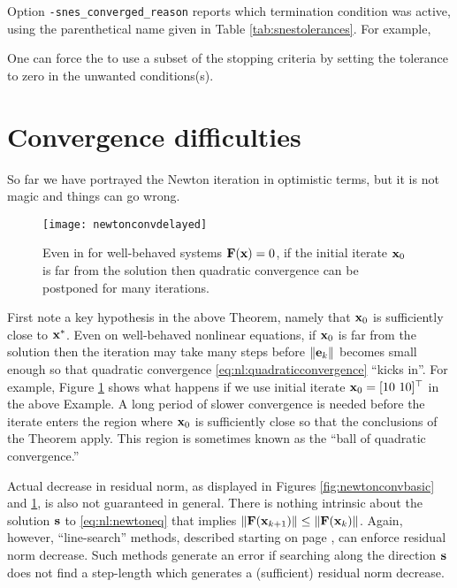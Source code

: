 \medskip
Option \texttt{-snes\_converged\_reason} reports which termination condition was active, using the parenthetical name given in Table \ref{tab:snestolerances}.  For example,
\vspace{-4mm}
One can force the \pSNES to use a subset of the stopping criteria by setting the tolerance to zero in the unwanted conditions(s).


\section{Convergence difficulties} \label{sec:divergence}

So far we have portrayed the Newton iteration in optimistic terms, but it is not magic and things can go wrong.

\begin{figure}
\texttt{[image: newtonconvdelayed]}
\caption{Even in for well-behaved systems $\mathbf{F}(\mathbf{x})=0$, if the initial iterate $\mathbf{x}_0$ is far from the solution then quadratic convergence can be postponed for many iterations.}
\label{fig:newtonconvdelayed}
\end{figure}

First note a key hypothesis in the above Theorem, namely that $\mathbf{x}_0$ is sufficiently close to $\mathbf{x}^*$.  Even on well-behaved nonlinear equations, if $\mathbf{x}_0$ is far from the solution then the iteration may take many steps before $\|\mathbf{e}_k\|$ becomes small enough so that quadratic convergence \eqref{eq:nl:quadraticconvergence} ``kicks in''.  For example, Figure \ref{fig:newtonconvdelayed} shows what happens if we use initial iterate $\mathbf{x}_0=[10\,\, 10]^\top$ in the above Example.  A long period of slower convergence is needed before the iterate enters the region where $\mathbf{x}_0$ is sufficiently close so that the conclusions of the Theorem apply.  This region is sometimes known as the ``ball of quadratic convergence.''

Actual decrease in residual norm, as displayed in Figures \ref{fig:newtonconvbasic} and \ref{fig:newtonconvdelayed}, is also not guaranteed in general.  There is nothing intrinsic about the solution $\mathbf{s}$ to \eqref{eq:nl:newtoneq} that implies $\|\mathbf{F}(\mathbf{x}_{k+1})\| \le \|\mathbf{F}(\mathbf{x}_k)\|$.  Again, however, ``line-search'' methods, described starting on page \pageref{sec:linesearch}, can enforce residual norm decrease.  Such methods generate an error if searching along the direction $\mathbf{s}$ does not find a step-length which generates a (sufficient) residual norm decrease.

